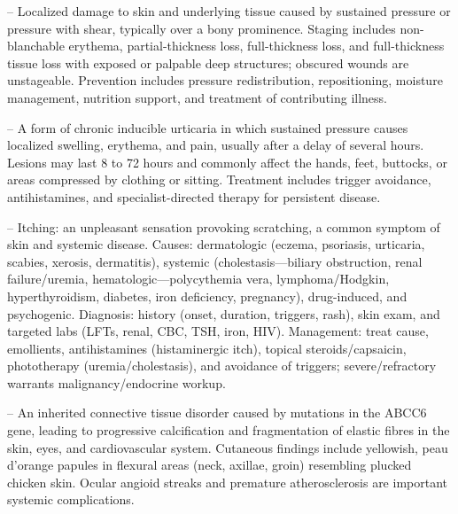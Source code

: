 -- Localized damage to skin and underlying tissue caused by sustained pressure or pressure with shear, typically over a bony prominence. Staging includes non-blanchable erythema, partial-thickness loss, full-thickness loss, and full-thickness tissue loss with exposed or palpable deep structures; obscured wounds are unstageable. Prevention includes pressure redistribution, repositioning, moisture management, nutrition support, and treatment of contributing illness.

-- A form of chronic inducible urticaria in which sustained pressure causes localized swelling, erythema, and pain, usually after a delay of several hours. Lesions may last 8 to 72 hours and commonly affect the hands, feet, buttocks, or areas compressed by clothing or sitting. Treatment includes trigger avoidance, antihistamines, and specialist-directed therapy for persistent disease.

-- Itching: an unpleasant sensation provoking scratching, a common symptom of skin and systemic disease. Causes: dermatologic (eczema, psoriasis, urticaria, scabies, xerosis, dermatitis), systemic (cholestasis—biliary obstruction, renal failure/uremia, hematologic—polycythemia vera, lymphoma/Hodgkin, hyperthyroidism, diabetes, iron deficiency, pregnancy), drug-induced, and psychogenic. Diagnosis: history (onset, duration, triggers, rash), skin exam, and targeted labs (LFTs, renal, CBC, TSH, iron, HIV). Management: treat cause, emollients, antihistamines (histaminergic itch), topical steroids/capsaicin, phototherapy (uremia/cholestasis), and avoidance of triggers; severe/refractory warrants malignancy/endocrine workup.

-- An inherited connective tissue disorder caused by mutations in the ABCC6 gene, leading to progressive calcification and fragmentation of elastic fibres in the skin, eyes, and cardiovascular system. Cutaneous findings include yellowish, peau d'orange papules in flexural areas (neck, axillae, groin) resembling plucked chicken skin. Ocular angioid streaks and premature atherosclerosis are important systemic complications.


